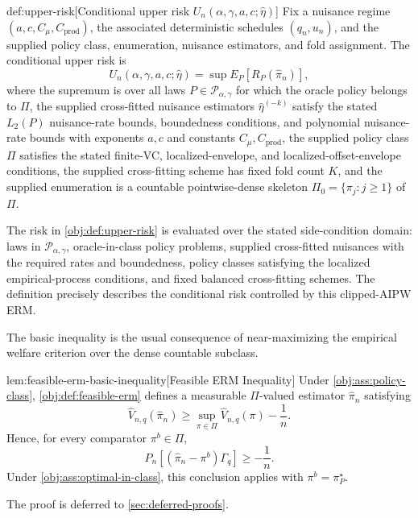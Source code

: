 \documentclass[11pt]{article}
\begin{document}
\begin{definitionv}{def:upper-risk}[Conditional upper risk \(U_n(\alpha,\gamma,a,c;\widehat\eta)\)]
Fix a nuisance regime \((a,c,C_\mu,C_{\mathrm{prod}})\), the associated deterministic schedules \((q_n,u_n)\), and the supplied policy class, enumeration, nuisance estimators, and fold assignment. The conditional upper risk is
\[
U_n(\alpha,\gamma,a,c;\widehat\eta)
=
\sup E_P\!\left[R_P(\widehat\pi_n)\right],
\]
where the supremum is over all laws \(P\in\mathcal P_{\alpha,\gamma}\) for which the oracle policy belongs to \(\Pi\), the supplied cross-fitted nuisance estimators \(\widehat\eta^{(-k)}\) satisfy the stated \(L_2(P)\) nuisance-rate bounds, boundedness conditions, and polynomial nuisance-rate bounds with exponents \(a,c\) and constants \(C_\mu,C_{\mathrm{prod}}\), the supplied policy class \(\Pi\) satisfies the stated finite-VC, localized-envelope, and localized-offset-envelope conditions, the supplied cross-fitting scheme has fixed fold count \(K\), and the supplied enumeration is a countable pointwise-dense skeleton \(\Pi_0=\{\pi_j:j\ge1\}\) of \(\Pi\).
\end{definitionv}

The risk in \cref{obj:def:upper-risk} is evaluated over the stated side-condition domain: laws in \(\mathcal P_{\alpha,\gamma}\), oracle-in-class policy problems, supplied cross-fitted nuisances with the required rates and boundedness, policy classes satisfying the localized empirical-process conditions, and fixed balanced cross-fitting schemes.  The definition precisely describes the conditional risk controlled by this clipped-AIPW ERM.

The basic inequality is the usual consequence of near-maximizing the empirical welfare criterion over the dense countable subclass.

\begin{lemmav}{lem:feasible-erm-basic-inequality}[Feasible ERM Inequality]
Under \cref{obj:ass:policy-class}, \cref{obj:def:feasible-erm} defines a measurable \(\Pi\)-valued estimator \(\widehat\pi_n\) satisfying
\[
\widehat V_{n,q}(\widehat\pi_n)
\ge
\sup_{\pi\in\Pi}\widehat V_{n,q}(\pi)-\frac1n .
\]
Hence, for every comparator \(\pi^b\in\Pi\),
\[
P_n\!\left[(\widehat\pi_n-\pi^b)\Gamma_q\right]\ge -\frac1n .
\]
Under \cref{obj:ass:optimal-in-class}, this conclusion applies with \(\pi^b=\pi^\star_P\).
\end{lemmav}

The proof is deferred to \cref{sec:deferred-proofs}.
\end{document}
